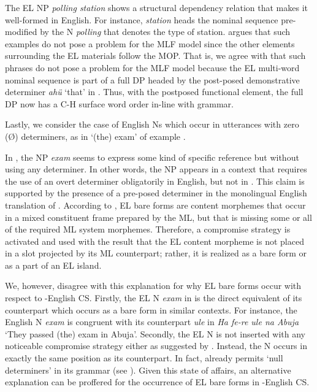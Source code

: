 \documentclass[output=paper]{langsci/langscibook}
\begin{document}
The EL NP \textit{polling station}\textbf{\textit{}} shows a structural dependency relation that makes it well-formed in English. For instance, \textit{station} heads the nominal sequence pre-modified by the N \textit{polling} that denotes the type of station. \citet{MyersScotton2002} argues that such examples do not pose a problem for the MLF model since the other elements surrounding the EL materials follow the MOP. That is, we agree with \citet[139]{MyersScotton2002} that such phrases do not pose a problem for the MLF model because the EL multi-word nominal sequence is part of a full DP headed by the post-posed  demonstrative determiner \textit{ahü} ‘that’ in . Thus, with the postposed  functional element, the full DP now has a C-H surface word order in-line with  grammar. 

Lastly, we consider the case of English Ns which occur in  utterances with zero (Ø) determiners, as in ‘(the) exam’ of example . 

In , the NP \textit{exam} seems to express some kind of specific reference but without using any determiner. In other words, the NP appears in a context that requires the use of an overt determiner obligatorily in English, but not in . This claim is supported by the presence of a pre-posed determiner in the monolingual English translation of . According to \citet[106]{MyersScottonJake2001}, EL bare forms are content morphemes that occur in a mixed constituent frame prepared by the ML, but that is missing some or all of the required ML system morphemes. Therefore, a compromise strategy is activated and used with the result that the EL content morpheme is not placed in a slot projected by its ML counterpart; rather, it is realized as a bare form or as a part of an EL island. 

We, however, disagree with this explanation for why EL bare forms occur with respect to -English CS. Firstly, the EL N \textit{exam} in  is the direct equivalent of its  counterpart which occurs as a bare form in similar contexts. For instance, the English N \textit{exam} is congruent with its  counterpart \textit{ule} in \textit{Ha fe-re ule na Abuja} ‘They passed (the) exam in Abuja’. Secondly, the EL N is not inserted with any noticeable compromise strategy either as suggested by \citet[106]{MyersScottonJake2001}. Instead, the N occurs in exactly the same position as its  counterpart. In fact,  already permits ‘null determiners’ in its grammar (see \citealt[64--65]{Obiamalu2013}). Given this state of affairs, an alternative explanation can be proffered for the occurrence of EL bare forms in -English CS. 
\end{document}
